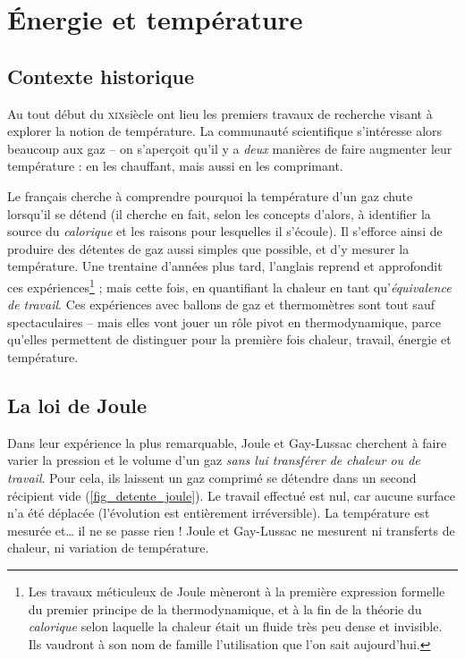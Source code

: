 		

\section{Énergie et température}

	\subsection{Contexte historique}
	
		Au tout début du \textsc{xix}\ieme siècle ont lieu les premiers travaux de recherche visant à explorer la notion de température. La communauté scientifique s’intéresse alors beaucoup aux gaz -- on s’aperçoit qu’il y a \emph{deux} manières de faire augmenter leur température : en les chauffant, mais aussi en les comprimant.
		
		Le français  cherche à comprendre pourquoi la température d’un gaz chute lorsqu’il se détend (il cherche en fait, selon les concepts d’alors, à identifier la source du \textit{calorique} et les raisons pour lesquelles il s’écoule). Il s’efforce ainsi de produire des détentes de gaz aussi simples que possible, et d’y mesurer la température. Une trentaine d’années plus tard, l’anglais  reprend et approfondit ces expériences\footnote{Les travaux méticuleux de Joule mèneront à la première expression formelle du premier principe de la thermodynamique, et à la fin de la théorie du \textit{calorique} selon laquelle la chaleur était un fluide très peu dense et invisible. Ils vaudront à son nom de famille l’utilisation que l’on sait aujourd’hui.} ; mais cette fois, en quantifiant la chaleur en tant qu’\textit{équivalence de travail}. Ces expériences avec ballons de gaz et thermomètres sont tout sauf spectaculaires -- mais elles vont jouer un rôle pivot en thermodynamique, parce qu’elles permettent de distinguer pour la première fois chaleur, travail, énergie et température.

	\subsection{La loi de Joule}
	\label{ch_principe_de_joule}

		Dans leur expérience la plus remarquable, Joule et Gay-Lussac cherchent à faire varier la pression et le volume d’un gaz \textit{sans lui transférer de chaleur ou de travail}. Pour cela, ils laissent un gaz comprimé se détendre dans un second récipient vide (\cref{fig_detente_joule}). Le travail effectué est nul, car aucune surface n’a été déplacée (l’évolution est entièrement irréversible). La température est mesurée et… il ne se passe rien ! Joule et Gay-Lussac ne mesurent ni transferts de chaleur, ni variation de température.

